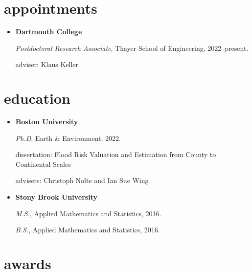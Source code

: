 \documentclass[10pt,oneside]{article}
\begin{document}

\section{appointments}

\mbox{}\vspace{-\dimexpr\baselineskip\relax}

\begin{itemize}[label={}]
  
  \item \textbf{Dartmouth College}
        
        \textit{Postdoctoral Research Associate}, Thayer School of Engineering, 2022--present.
        
        adviser: Klaus Keller
        
        
        
\end{itemize}


\section{education}

\mbox{}\vspace{-\dimexpr\baselineskip\relax}

\begin{itemize}[label={}]
  
  \item \textbf{Boston University}
        
        \textit{Ph.D}, Earth \& Environment, 2022.
        
        
        dissertation: Flood Risk Valuation and Estimation from County to Continental Scales
        
        advisers: Christoph Nolte and Ian Sue Wing
        
        
  \item \textbf{Stony Brook University}
        
        \textit{M.S.}, Applied Mathematics and Statistics, 2016.
        
        \textit{B.S.}, Applied Mathematics and Statistics, 2016.
        
        
        
\end{itemize}


\section{awards}
\end{document}
